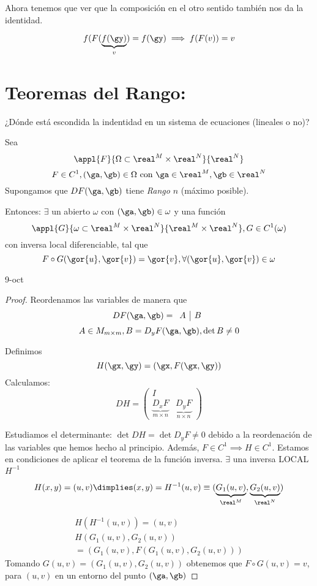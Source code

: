 \documentclass{apuntes}
\begin{document}
Ahora tenemos que ver que la composición en el otro sentido también nos da la identidad.

\[f(F(\underbrace{f(\gy)}_{v}) = f(\gy) \implies f(F(v)) = v\]

\section{Teoremas del Rango:}

¿Dónde está escondida la indentidad en un sistema de ecuaciones (lineales o no)?

\begin{theorem}[Rango 1]
Sea \[\appl{F}{\Omega\subset \real^M\times\real^N}{\real^N}\]
\[F\in C^1, (\ga,\gb) \in \Omega \text{ con } \ga \in \real^M, \gb \in \real^N\]
Supongamos que $DF(\ga,\gb)$ tiene \emph{Rango} $n$ (máximo posible).

Entonces: $\exists$ un abierto $\omega$ con $(\ga,\gb) \in \omega$ y una función \[ \appl{G}{\omega\subset\real^M\times\real^N}{\real^M\times\real^N}, G\in C^1 (\omega)\] con inversa local diferenciable, tal que \[F\circ G(\gor{u},\gor{v}) = \gor{v}, \forall(\gor{u},\gor{v})\in \omega\]

\end{theorem}

9-oct

\begin{proof}
 Reordenamos las variables de manera que \[DF(\ga,\gb) = \begin{array}{c|c} A &B \end{array}\]
 \[A \in M_{m\times m}, B = D_yF(\ga,\gb), \det B \neq 0\]
 
 Definimos \[H(\gx,\gy) = (\gx,F(\gx,\gy))\]
 Calculamos:
 \[DH = \left(\begin{array}{c|c}
         I & \\
         \underbrace{D_xF}_{m\times n} & \underbrace{D_yF}_{n\times n}
        \end{array}\right)\]
        
        
  Estudiamos el determinante: $\det DH = \det D_yF \neq 0$ debido a la reordenación de las variables que hemos hecho al principio. Además, $F\in C^1 \implies H \in C^1$. Estamos en condiciones de aplicar el teorema de la función inversa. $\exists$ una inversa LOCAL $H^{-1}$

  \[H(x,y) = (u,v) \dimplies (x,y) = H^{-1}(u,v) \equiv (\underbrace{G_1(u,v)}_{\real^M},\underbrace{G_2(u,v)}_{\real^N})\]
  
  \begin{gather*}
H(H^{-1}(u,v)) = (u,v)\\
H(G_1(u,v),G_2(u,v))\\
= (G_1(u,v),F(G_1(u,v),G_2(u,v)))
  \end{gather*}
 Tomando $G(u,v) = (G_1(u,v),G_2(u,v))$ obtenemos que $F\circ G(u,v) = v$, para $(u,v)$ en un entorno del punto $(\ga,\gb)$
 
\end{proof}
\end{document}
